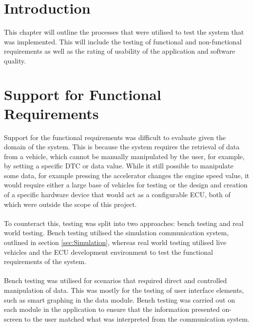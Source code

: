 \section{Introduction}
	\paragraph{}{
	This chapter will outline the processes that were utilised to test the system that was implemented. This will include the testing of functional and non-functional requirements as well as the rating of usability of the application and software quality.
	}
	
\section{Support for Functional Requirements}
	\paragraph{}{
	Support for the functional requirements was difficult to evaluate given the domain of the system. This is because the system requires the retrieval of data from a vehicle, which cannot be manually manipulated by the user, for example, by setting a specific DTC or data value. While it still possible to manipulate some data, for example pressing the accelerator changes the engine speed value, it would require either a large base of vehicles for testing or the design and creation of a specific hardware device that would act as a configurable ECU, both of which were outside the scope of this project.
	}

	\paragraph{}{
	To counteract this, testing was split into two approaches: bench testing and real world testing. Bench testing utilised the simulation communication system, outlined in section \ref{sec:Simulation}, whereas real world testing utilised live vehicles and the ECU development environment to test the functional requirements of the system. 
	}
	
	\paragraph{}{
	Bench testing was utilised for scenarios that required direct and controlled manipulation of data. This was mostly for the testing of user interface elements, such as smart graphing in the data module. Bench testing was carried out on each module in the application to ensure that the information presented on-screen to the user matched what was interpreted from the communication system. 
	}
	
